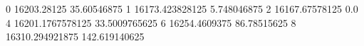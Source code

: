 0 16203.28125 35.60546875
1 16173.423828125 5.748046875
2 16167.67578125 0.0
4 16201.1767578125 33.5009765625
6 16254.4609375 86.78515625
8 16310.294921875 142.619140625

